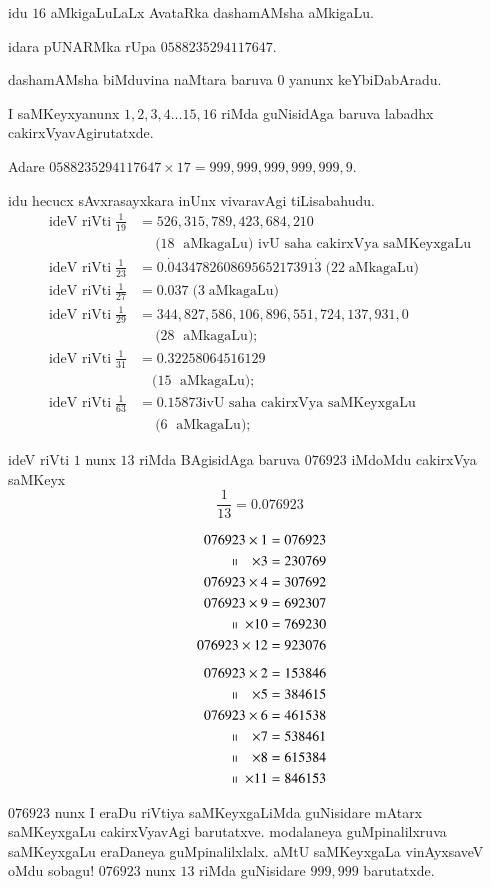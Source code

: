 idu $16$ aMkigaLuLaLx AvataRka dashamAMsha aMkigaLu.

idara pUNARMka rUpa $0588235294117647$.

dashamAMsha biMduvina naMtara baruva $0$ yanunx keYbiDabAradu.

I saMKeyxyanunx $1,2,3,4\ldots 15,16$ riMda guNisidAga baruva labadhx cakirxVyavAgirutatxde.

Adare $0588235294117647\times 17=999,999,999,999,999,9$.

idu hecucx sAvxrasayxkara inUnx vivaravAgi tiLisabahudu.
\begin{align*}
\text{ideV riVti} \;\frac{1}{19} &=  526, 315, 789, 423, 684, 210\\
&\quad ~(18\; \text{ aMkagaLu)  ivU saha cakirxVya saMKeyxgaLu}\\[0.1cm]
\text{ideV riVti}\; \frac{1}{23} &=  0.{\dot 0}43478260869565217391{\dot 3}\; (22 \;\text{aMkagaLu)}\\
\text{ideV riVti} \;\frac{1}{27} &=  0.037 \;(3 \;\text{aMkagaLu)}\\
\text{ideV riVti} \;\frac{1}{29} &=  344,827,586,106,896,551,724,137,931,0\\
&\quad ~(28\; \text{ aMkagaLu)};\\
\text{ideV riVti} \;\frac{1}{31} &=  0.32258064516129\\
&\quad(15\; \text{ aMkagaLu)};\\
\text{ideV riVti}\;\frac{1}{63} &=   0.15873 \text{ivU saha cakirxVya saMKeyxgaLu}\\
 &\quad ~(6\; \text{ aMkagaLu)};
\end{align*}

ideV riVti $1$ nunx $13$ riMda BAgisidAga baruva $076923$ iMdoMdu cakirxVya saMKeyx
$$
\frac{1}{13} = 0.076923
$$
\newpage

\begin{align*}
076923 \times 1 &= 076923 \\
~~~~~~~~~\shortparallel ~~~\times 3 &= 230769 \\ 
076923\times 4 &= 307692 \\
076923\times 9 &= 692307 \\ 
~~~~~~~~~~~\shortparallel ~\times 10 &= 769230 \\
076923\times 12 &= 923076\\[5pt] 
076923 \times 2 &= 153846 \\
~~~~~~~~~\shortparallel ~~~\times 5 &= 384615 \\
076923   \times 6 &= 461538 \\
~~~~~~~~~\shortparallel ~~~\times 7 &= 538461 \\
~~~~~~~~~\shortparallel ~~~\times 8 &= 615384 \\
~~~~~~~~~~~\shortparallel ~\times 11 &= 846153 
\end{align*}

$076923$ nunx  I eraDu riVtiya saMKeyxgaLiMda guNisidare mAtarx saMKeyxgaLu cakirxVyavAgi barutatxve. modalaneya guMpinalilxruva saMKeyxgaLu eraDaneya guMpinalilxlalx. aMtU saMKeyxgaLa vinAyxsaveV oMdu sobagu! $076923$ nunx $13$ riMda guNisidare $999,999$ barutatxde.
